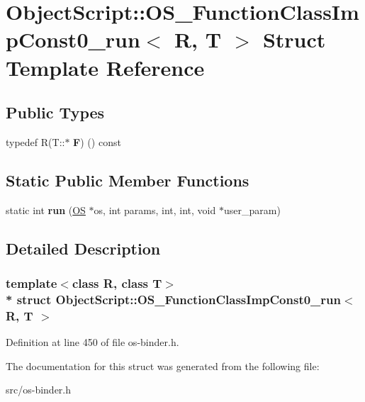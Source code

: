 \hypertarget{struct_object_script_1_1_o_s___function_class_imp_const0__run}{}\section{Object\+Script\+:\+:O\+S\+\_\+\+Function\+Class\+Imp\+Const0\+\_\+run$<$ R, T $>$ Struct Template Reference}
\label{struct_object_script_1_1_o_s___function_class_imp_const0__run}
\subsection*{Public Types}
\begin{DoxyCompactItemize}
\item 
typedef R(T\+::$\ast$ {\bfseries F}) () const \hypertarget{struct_object_script_1_1_o_s___function_class_imp_const0__run_ad409687ae5cdcceae5c0466711635acd}{}\label{struct_object_script_1_1_o_s___function_class_imp_const0__run_ad409687ae5cdcceae5c0466711635acd}

\end{DoxyCompactItemize}
\subsection*{Static Public Member Functions}
\begin{DoxyCompactItemize}
\item 
static int {\bfseries run} (\hyperlink{class_object_script_1_1_o_s}{OS} $\ast$os, int params, int, int, void $\ast$user\+\_\+param)\hypertarget{struct_object_script_1_1_o_s___function_class_imp_const0__run_a9eb94627137f74325d8ab99245c99062}{}\label{struct_object_script_1_1_o_s___function_class_imp_const0__run_a9eb94627137f74325d8ab99245c99062}

\end{DoxyCompactItemize}


\subsection{Detailed Description}
\subsubsection*{template$<$class R, class T$>$\\*
struct Object\+Script\+::\+O\+S\+\_\+\+Function\+Class\+Imp\+Const0\+\_\+run$<$ R, T $>$}



Definition at line 450 of file os-\/binder.\+h.



The documentation for this struct was generated from the following file\+:\begin{DoxyCompactItemize}
\item 
src/os-\/binder.\+h\end{DoxyCompactItemize}
